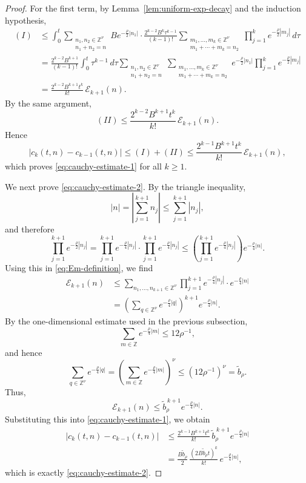 \documentclass[12pt,reqno,tbtags]{amsart}
\newcommand\1{\mathbbm{1}}
\begin{document}
\begin{proof}
For the first term, by Lemma~\ref{lem:uniform-exp-decay} and the induction hypothesis,
\begin{align*}
(I)
&\leq
\int_0^t
\sum_{\substack{n_1,n_2\in \mathbb{Z}^{\nu}\\ n_1+n_2=n}}
B e^{-\frac{\rho}{2}|n_1|}
\cdot
\frac{2^{k-2}B^k\tau^{k-1}}{(k-1)!}
\sum_{\substack{m_1,\dots,m_k\in \mathbb{Z}^{\nu}\\ m_1+\cdots+m_k=n_2}}
\prod_{j=1}^{k} e^{-\frac{\rho}{2}|m_j|}
\,d\tau \\
&=
\frac{2^{k-2}B^{k+1}}{(k-1)!}
\int_0^t \tau^{k-1}\,d\tau
\sum_{\substack{n_1,n_2\in \mathbb{Z}^{\nu}\\ n_1+n_2=n}}
\sum_{\substack{m_1,\dots,m_k\in \mathbb{Z}^{\nu}\\ m_1+\cdots+m_k=n_2}}
e^{-\frac{\rho}{2}|n_1|}
\prod_{j=1}^{k} e^{-\frac{\rho}{2}|m_j|} \\
&=
\frac{2^{k-2}B^{k+1}t^k}{k!}\,\mathcal{E}_{k+1}(n).
\end{align*}
By the same argument,
\[
(II)\leq \frac{2^{k-2}B^{k+1}t^k}{k!}\,\mathcal{E}_{k+1}(n).
\]
Hence
\[
|c_k(t,n)-c_{k-1}(t,n)|
\leq
(I)+(II)
\leq
\frac{2^{k-1}B^{k+1}t^k}{k!}\,\mathcal{E}_{k+1}(n),
\]
which proves \eqref{eq:cauchy-estimate-1} for all $k\geq 1$.

We next prove \eqref{eq:cauchy-estimate-2}. By the triangle inequality,
\[
|n|
=
\left| \sum_{j=1}^{k+1} n_j \right|
\leq
\sum_{j=1}^{k+1} |n_j|,
\]
and therefore
\[
\prod_{j=1}^{k+1} e^{-\frac{\rho}{2}|n_j|}
=
\prod_{j=1}^{k+1} e^{-\frac{\rho}{4}|n_j|}
\cdot
\prod_{j=1}^{k+1} e^{-\frac{\rho}{4}|n_j|}
\leq
\left(
\prod_{j=1}^{k+1} e^{-\frac{\rho}{4}|n_j|}
\right)
e^{-\frac{\rho}{4}|n|}.
\]
Using this in \eqref{eq:Em-definition}, we find
\begin{align*}
\mathcal{E}_{k+1}(n)
&\leq
\sum_{n_1,\dots,n_{k+1}\in \mathbb{Z}^{\nu}}
\prod_{j=1}^{k+1} e^{-\frac{\rho}{4}|n_j|}
\cdot
e^{-\frac{\rho}{4}|n|} \\
&=
\left(
\sum_{q\in \mathbb{Z}^{\nu}} e^{-\frac{\rho}{4}|q|}
\right)^{k+1}
e^{-\frac{\rho}{4}|n|}.
\end{align*}
By the one-dimensional estimate used in the previous subsection,
\[
\sum_{m\in \mathbb{Z}} e^{-\frac{\rho}{4}|m|}\leq 12\rho^{-1},
\]
and hence
\[
\sum_{q\in \mathbb{Z}^{\nu}} e^{-\frac{\rho}{4}|q|}
=
\left(
\sum_{m\in \mathbb{Z}} e^{-\frac{\rho}{4}|m|}
\right)^\nu
\leq
(12\rho^{-1})^\nu
=
\widetilde b_{\rho}.
\]
Thus,
\[
\mathcal{E}_{k+1}(n)
\leq
\widetilde b_{\rho}^{\,k+1} e^{-\frac{\rho}{4}|n|}.
\]
Substituting this into \eqref{eq:cauchy-estimate-1}, we obtain
\begin{align*}
|c_k(t,n)-c_{k-1}(t,n)|
&\leq
\frac{2^{k-1}B^{k+1}t^k}{k!}\,
\widetilde b_{\rho}^{\,k+1}
e^{-\frac{\rho}{4}|n|} \\
&=
\frac{B\widetilde b_{\rho}}{2}\,
\frac{(2B\widetilde b_{\rho}t)^k}{k!}\,
e^{-\frac{\rho}{4}|n|},
\end{align*}
which is exactly \eqref{eq:cauchy-estimate-2}.


\end{proof}
\end{document}
